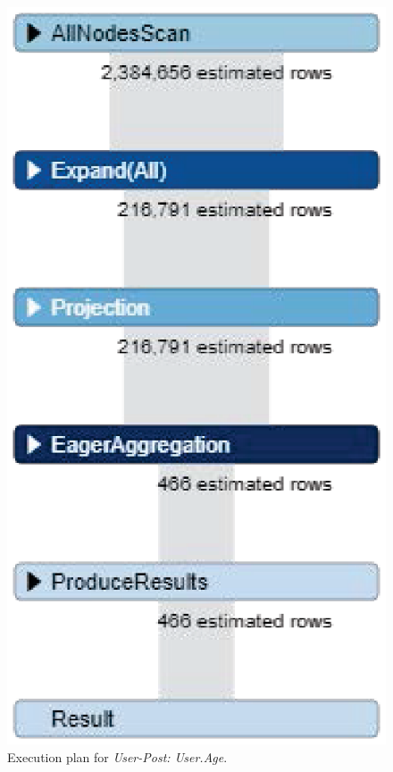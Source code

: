 \begin{figure}[H]
	\centering
	\includegraphics[scale=0.7]{"pic/wrong.eps"}
	\caption{Execution plan for \textit{User-Post: User.Age}.}
	\label{fig:wrong1}
\end{figure}

